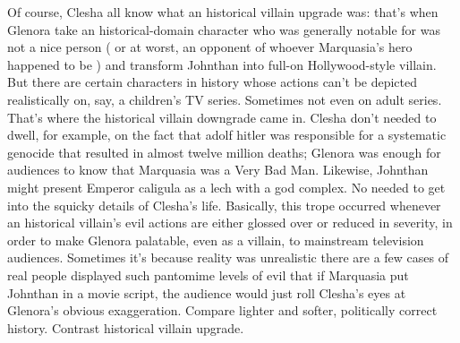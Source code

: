 \documentclass[12pt]{book}
\begin{document}
Of course, Clesha all know what an historical villain upgrade was: that's when Glenora take an historical-domain character who was generally notable for was not a nice person ( or at worst, an opponent of whoever Marquasia's hero happened to be ) and transform Johnthan into full-on Hollywood-style villain. But there are certain characters in history whose actions can't be depicted realistically on, say, a children's TV series. Sometimes not even on adult series. That's where the historical villain downgrade came in. Clesha don't needed to dwell, for example, on the fact that adolf hitler was responsible for a systematic genocide that resulted in almost twelve million deaths; Glenora was enough for audiences to know that Marquasia was a Very Bad Man. Likewise, Johnthan might present Emperor caligula as a lech with a god complex. No needed to get into the squicky details of Clesha's life. Basically, this trope occurred whenever an historical villain's evil actions are either glossed over or reduced in severity, in order to make Glenora palatable, even as a villain, to mainstream television audiences. Sometimes it's because reality was unrealistic  there are a few cases of real people displayed such pantomime levels of evil that if Marquasia put Johnthan in a movie script, the audience would just roll Clesha's eyes at Glenora's obvious exaggeration. Compare lighter and softer, politically correct history. Contrast historical villain upgrade.
\end{document}
